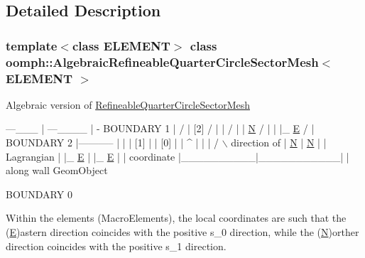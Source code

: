 \subsection{Detailed Description}
\subsubsection*{template$<$class E\+L\+E\+M\+E\+NT$>$\newline
class oomph\+::\+Algebraic\+Refineable\+Quarter\+Circle\+Sector\+Mesh$<$ E\+L\+E\+M\+E\+N\+T $>$}

Algebraic version of \hyperlink{classoomph_1_1RefineableQuarterCircleSectorMesh}{Refineable\+Quarter\+Circle\+Sector\+Mesh}


\begin{DoxyCode}
                     ---\_\_\_
                    |      ---\_\_\_\_
                    |              -   BOUNDARY 1
                    |               /  
                    |     [2]      /  |  
                    |             /     | 
                    | \hyperlink{namespaceoomph_1_1QuadTreeNames_a8954a5947b19986b8c4b755bc7639f7dabc60bec4cc294aa2adf92726c6d6823a}{N}          /        |  
                    | |\_ \hyperlink{namespaceoomph_1_1QuadTreeNames_a8954a5947b19986b8c4b755bc7639f7da585070bd0e3801c3bbed287ef3c4a265}{E}      /          |    
     BOUNDARY 2     |-----------           |  
                    |          |    [1]    |
                    |   [0]    |           |  ^
                    |          |           | / \(\backslash\)  direction of
                    | \hyperlink{namespaceoomph_1_1QuadTreeNames_a8954a5947b19986b8c4b755bc7639f7dabc60bec4cc294aa2adf92726c6d6823a}{N}        |    \hyperlink{namespaceoomph_1_1QuadTreeNames_a8954a5947b19986b8c4b755bc7639f7dabc60bec4cc294aa2adf92726c6d6823a}{N}      |  |   Lagrangian 
                    | |\_ \hyperlink{namespaceoomph_1_1QuadTreeNames_a8954a5947b19986b8c4b755bc7639f7da585070bd0e3801c3bbed287ef3c4a265}{E}     |    |\_ \hyperlink{namespaceoomph_1_1QuadTreeNames_a8954a5947b19986b8c4b755bc7639f7da585070bd0e3801c3bbed287ef3c4a265}{E}   |  |   coordinate 
                    |\_\_\_\_\_\_\_\_\_\_|\_\_\_\_\_\_\_\_\_\_\_|  |   along wall GeomObject

                         BOUNDARY 0

Within the elements (MacroElements), the local coordinates
are such that the (\hyperlink{namespaceoomph_1_1QuadTreeNames_a8954a5947b19986b8c4b755bc7639f7da585070bd0e3801c3bbed287ef3c4a265}{E})astern direction coincides with the positive 
s\_0 direction,  \textcolor{keywordflow}{while} the (\hyperlink{namespaceoomph_1_1QuadTreeNames_a8954a5947b19986b8c4b755bc7639f7dabc60bec4cc294aa2adf92726c6d6823a}{N})orther direction coincides with the positive 
s\_1 direction.
\end{DoxyCode}


